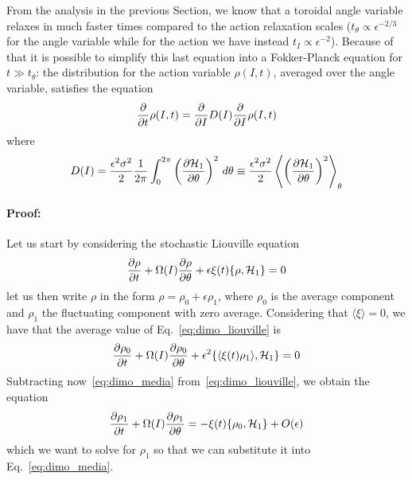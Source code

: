 From the analysis in the previous Section, we know that a toroidal angle variable relaxes in much faster times compared to the action relaxation scales (\(t_{\theta} \propto \epsilon^{-2/3}\) for the angle variable while for the action we have instead \(t_{I} \propto \epsilon^{-2}\)). Because of that it is possible to simplify this last equation into a Fokker-Planck equation for \(t\gg t_{\theta}\): the distribution for the action variable \(\rho(I,t)\), averaged over the angle variable, satisfies the equation
\begin{equation}
	\pdv{}{t}\/\rho(I,t) = \pdv{}{I}\/D(I)\pdv{}{I}\/\rho(I,t)
\end{equation}
where
\begin{equation}
	D(I) = \frac{\epsilon^2 \sigma^2}{2}\frac{1}{2\pi}\int_0^{2\pi}\left(\pdv{\mathcal{H}_1}{\theta}\/\right)^2 \,d\theta \equiv \frac{\epsilon^2 \sigma^2}{2} \left\langle \left( \pdv{\mathcal{H}_1}{\theta}\/  \right)^2 \right\rangle_\theta
\end{equation}

\paragraph{Proof:}
Let us start by considering the stochastic Liouville equation
\begin{equation}
	\pdv{\rho}{t}\/ + \Omega(I) \pdv{\rho}{\theta}\/ + \epsilon\xi(t)\{\rho,\mathcal{H}_1\} = 0
	\label{eq:dimo_liouville}
\end{equation}
let us then write \(\rho\) in the form \(\rho = \rho_0 + \epsilon\rho_1\), where \(\rho_0\) is the average component and \(\rho_1\) the fluctuating component with zero average. Considering that \(\langle\xi\rangle = 0\), we have that the average value of Eq.~\eqref{eq:dimo_liouville} is
\begin{equation}
	\pdv{\rho_0}{t}\/ + \Omega(I)\pdv{\rho_0}{\theta}\/ + \epsilon^2\{\langle\xi(t)\rho_1\rangle, \mathcal{H}_1\} = 0
	\label{eq:dimo_media}
\end{equation}
Subtracting now~\eqref{eq:dimo_media} from~\eqref{eq:dimo_liouville}, we obtain the equation
\begin{equation}
	\pdv{\rho_1}{t}\/ + \Omega(I) \pdv{\rho_1}{\theta}\/ = -\xi(t)\{\rho_0, \mathcal{H}_1\} + O(\epsilon)
\end{equation}
which we want to solve for \(\rho_1\) so that we can substitute it into Eq.~\eqref{eq:dimo_media}.

